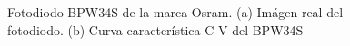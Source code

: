 \documentclass[a4paper,conference]{IEEEtran}
\begin{document}
        \begin{figure}[!b]
            \centering
            \hfil
            \caption{Fotodiodo BPW34S de la marca Osram. (a) Imágen real del
            fotodiodo. (b) Curva característica C-V del BPW34S}
            \label{fig:bpw34}
        \end{figure}



\nocite{*}
\end{document}
